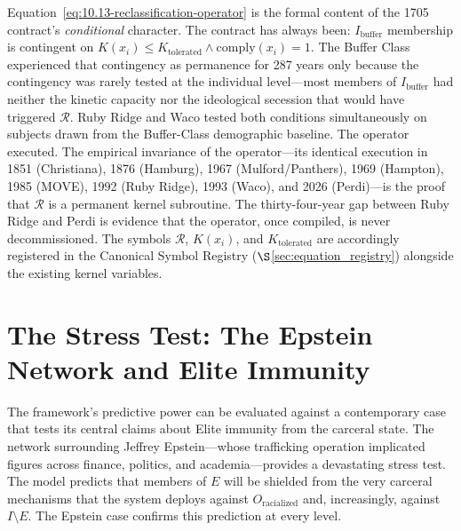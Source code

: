 Equation~\eqref{eq:10.13-reclassification-operator} is the formal content of the 1705 contract's \textit{conditional} character. The contract has always been: $I_{\text{buffer}}$ membership is contingent on $K(x_i) \leq K_{\text{tolerated}} \wedge \mathrm{comply}(x_i) = 1$. The Buffer Class experienced that contingency as permanence for 287 years only because the contingency was rarely tested at the individual level---most members of $I_{\text{buffer}}$ had neither the kinetic capacity nor the ideological secession that would have triggered $\mathcal{R}$. Ruby Ridge and Waco tested both conditions simultaneously on subjects drawn from the Buffer-Class demographic baseline. The operator executed. The empirical invariance of the operator---its identical execution in 1851 (Christiana), 1876 (Hamburg), 1967 (Mulford/Panthers), 1969 (Hampton), 1985 (MOVE), 1992 (Ruby Ridge), 1993 (Waco), and 2026 (Perdi)---is the proof that $\mathcal{R}$ is a permanent kernel subroutine. The thirty-four-year gap between Ruby Ridge and Perdi is evidence that the operator, once compiled, is never decommissioned. The symbols $\mathcal{R}$, $K(x_i)$, and $K_{\text{tolerated}}$ are accordingly registered in the Canonical Symbol Registry ($\S$\ref{sec:equation_registry}) alongside the existing kernel variables.

\section{The Stress Test: The Epstein Network and Elite Immunity}

The framework's predictive power can be evaluated against a contemporary case that tests its central claims about Elite immunity from the carceral state. The network surrounding Jeffrey Epstein---whose trafficking operation implicated figures across finance, politics, and academia---provides a devastating stress test. The model predicts that members of $E$ will be shielded from the very carceral mechanisms that the system deploys against $O_{\text{racialized}}$ and, increasingly, against $I \setminus E$. The Epstein case confirms this prediction at every level.

